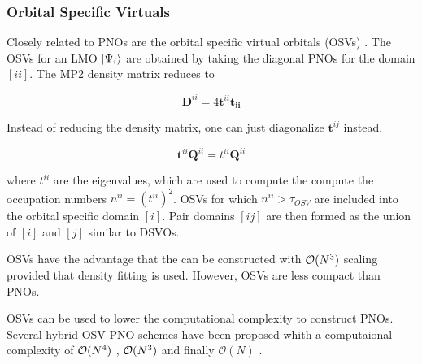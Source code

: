 

\subsubsection*{Orbital Specific Virtuals}

Closely related to PNOs are the orbital specific virtual orbitals (OSVs) \cite{Yan2011}. The OSVs for an LMO $\ket{\Psi_i}$ are obtained by taking the diagonal PNOs for the domain $[ii]$. The MP2 density matrix reduces to

\begin{equation}
\mathbf{D}^{ii} = 4 \mathbf{t}^{ii} \mathbf{t_{ii}}
\end{equation}

Instead of reducing the density matrix, one can just diagonalize $\mathbf{t}^{ij}$ instead. 

\begin{equation}
\mathbf{t}^{ii} \mathbf{Q}^{ii} = t^{ii} \mathbf{Q}^{ii}
\end{equation}

\noindent where $t^{ii}$ are the eigenvalues, which are used to compute the compute the occupation numbers $n^{ii} = \left( t^{ii} \right)^2$. OSVs for which $n^{ii} > \tau_{OSV}$ are included into the orbital specific domain $[i]$. Pair domains $[ij]$ are then formed as the union of $[i]$ and $[j]$ similar to DSVOs. 

OSVs have the advantage that the can be constructed with $\mathcal{O}(N^{3})$ scaling provided that density fitting is used. However, OSVs are less compact than PNOs.

OSVs can be used to lower the computational complexity to construct PNOs. Several hybrid OSV-PNO schemes have been proposed whith a computaional complexity of $\mathcal{O}(N^{4})$ \cite{Kra2012, Hat2012}, $\mathcal{O}(N^{3})$ \cite{Sch2013} and finally $\mathcal{O}(N)$ \cite{Rip2013}.




